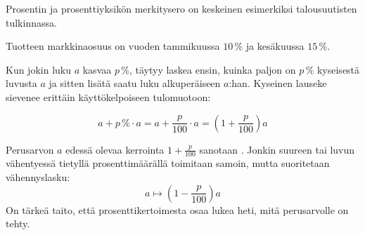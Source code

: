 
Prosentin ja prosenttiyksikön merkitysero on keskeinen esimerkiksi talousuutisten tulkinnassa.

\begin{esimerkki}
    Tuotteen markkinaosuus on vuoden tammikuussa $10$\,\% ja kesäkuussa $15$\,\%.

    \begin{esimratk}
    \end{esimratk}
	\begin{esimvast}
	\end{esimvast}
\end{esimerkki}



Kun jokin luku $a$ kasvaa $p\,\%$, täytyy laskea ensin, kuinka paljon on $p\,\%$ kyseisestä luvusta $a$ ja sitten lisätä saatu luku alkuperäiseen $a$:han. Kyseinen lauseke sievenee erittäin käyttökelpoiseen tulomuotoon:

$$a+ p\,\% \cdot a=a+ \frac{p}{100} \cdot a = (1+\frac{p}{100})a $$

Perusarvon $a$ edessä olevaa kerrointa $1+\frac{p}{100}$ sanotaan . Jonkin suureen tai luvun vähentyessä tietyllä prosenttimäärällä toimitaan samoin, mutta suoritetaan vähennyslasku:
$$a \mapsto (1-\frac{p}{100})a$$
On tärkeä taito, että prosenttikertoimesta osaa lukea heti, mitä perusarvolle on tehty.


